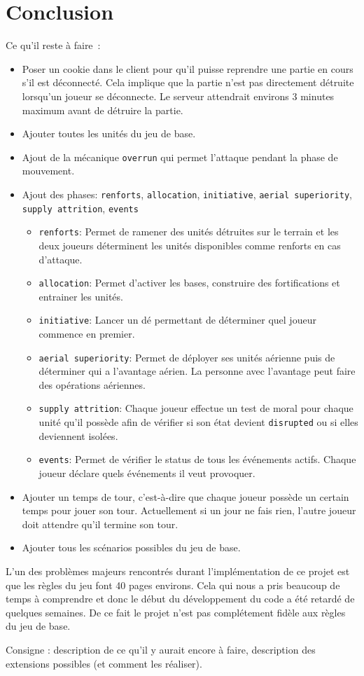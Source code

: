 \section{Conclusion}

Ce qu'il reste à faire :
\begin{itemize}
    \item Poser un cookie dans le client pour qu'il puisse reprendre une partie en cours s'il est déconnecté.
          Cela implique que la partie n'est pas directement détruite lorsqu'un joueur se déconnecte. Le serveur attendrait environs 3 minutes maximum avant de détruire la partie.
    \item Ajouter toutes les unités du jeu de base.
    \item Ajout de la mécanique {\tt overrun} qui permet l'attaque pendant la phase de mouvement.
    \item Ajout des phases: {\tt renforts}, {\tt allocation}, {\tt initiative}, {\tt aerial superiority}, {\tt supply attrition}, {\tt events}
          \begin{itemize}
              \item {\tt renforts}: Permet de ramener des unités détruites sur le terrain et les deux joueurs déterminent les unités disponibles comme renforts en cas d'attaque.
              \item {\tt allocation}: Permet d'activer les bases, construire des fortifications et entrainer les unités.
              \item {\tt initiative}: Lancer un dé permettant de déterminer quel joueur commence en premier.
              \item {\tt aerial superiority}: Permet de déployer ses unités aérienne puis de déterminer qui a l'avantage aérien.
                    La personne avec l'avantage peut faire des opérations aériennes.
              \item {\tt supply attrition}: Chaque joueur effectue un test de moral pour chaque unité qu'il possède afin de vérifier si son état devient {\tt disrupted} ou si elles deviennent isolées.
              \item {\tt events}: Permet de vérifier le status de tous les événements actifs. Chaque joueur déclare quels événements il veut provoquer.
          \end{itemize}
    \item Ajouter un temps de tour, c'est-à-dire que chaque joueur possède un certain temps pour jouer son tour. Actuellement si un jour ne fais rien, l'autre joueur doit attendre qu'il termine son tour.
    \item Ajouter tous les scénarios possibles du jeu de base.
\end{itemize}

L'un des problèmes majeurs rencontrés durant l'implémentation de ce projet est que les règles du jeu font 40 pages environs.
Cela qui nous a pris beaucoup de temps à comprendre et donc le début du développement du code a été retardé de quelques semaines.
De ce fait le projet n'est pas complétement fidèle aux règles du jeu de base.

Consigne : description de ce qu’il y aurait encore à faire, description des extensions possibles (et comment les réaliser).